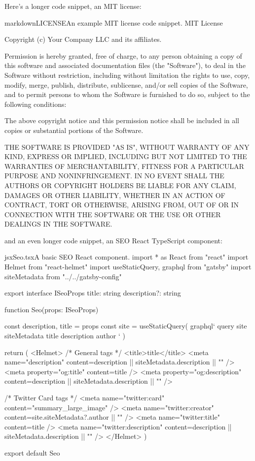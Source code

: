 \documentclass[a4paper,headinclude=on,footinclude=on,12pt,oneside]{scrbook}
\begin{document}
Here's a longer code snippet, an MIT license:

\begin{codeInput}{markdown}{LICENSE}{An example MIT license code snippet.}
MIT License

Copyright (c) Your Company LLC and its affiliates.

Permission is hereby granted, free of charge, to any person obtaining a copy
of this software and associated documentation files (the "Software"), to deal
in the Software without restriction, including without limitation the rights
to use, copy, modify, merge, publish, distribute, sublicense, and/or sell
copies of the Software, and to permit persons to whom the Software is
furnished to do so, subject to the following conditions:

The above copyright notice and this permission notice shall be included in all
copies or substantial portions of the Software.

THE SOFTWARE IS PROVIDED "AS IS", WITHOUT WARRANTY OF ANY KIND, EXPRESS OR
IMPLIED, INCLUDING BUT NOT LIMITED TO THE WARRANTIES OF MERCHANTABILITY,
FITNESS FOR A PARTICULAR PURPOSE AND NONINFRINGEMENT. IN NO EVENT SHALL THE
AUTHORS OR COPYRIGHT HOLDERS BE LIABLE FOR ANY CLAIM, DAMAGES OR OTHER
LIABILITY, WHETHER IN AN ACTION OF CONTRACT, TORT OR OTHERWISE, ARISING FROM,
OUT OF OR IN CONNECTION WITH THE SOFTWARE OR THE USE OR OTHER DEALINGS IN THE
SOFTWARE.
\end{codeInput}

and an even longer code snippet, an SEO React TypeScript component:

\begin{codeInput}{jsx}{Seo.tsx}{A basic SEO React component.}
import * as React from "react"
import { Helmet } from "react-helmet"
import { useStaticQuery, graphql } from "gatsby"
import { siteMetadata } from "../../gatsby-config"

export interface ISeoProps {
  title: string
  description?: string
}

function Seo(props: ISeoProps) {
  const { description, title } = props
  const { site } = useStaticQuery(
    graphql`
      query {
        site {
          siteMetadata {
            title
            description
            author
          }
        }
      }
    `
  )

  return (
    <Helmet>
      {/* General tags */}
      <title>{title}</title>
      <meta
        name="description"
        content={description || siteMetadata.description || ""}
      />
      <meta property="og:title" content={title} />
      <meta
        property="og:description"
        content={description || siteMetadata.description || ""}
      />

      {/* Twitter Card tags */}
      <meta name="twitter:card" content="summary_large_image" />
      <meta name="twitter:creator" content={site.siteMetadata?.author || ""} />
      <meta name="twitter:title" content={title} />
      <meta
        name="twitter:description"
        content={description || siteMetadata.description || ""}
      />
    </Helmet>
  )
}

export default Seo
\end{codeInput}
\end{document}
